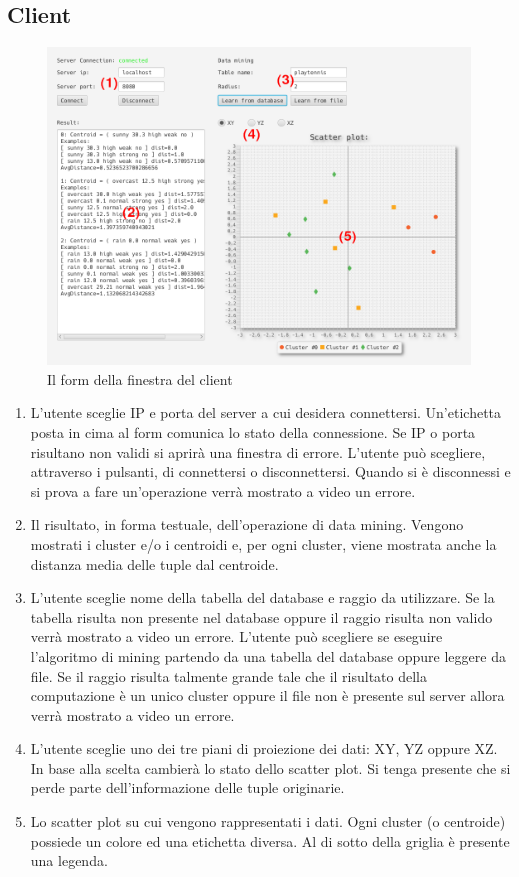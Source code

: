 \documentclass{article}
\begin{document}
	\subsection{Client}
	\begin{figure}[h]
		\includegraphics[width=\linewidth]{windowform.png}
		\caption{Il form della finestra del client}
	\end{figure}
	\begin{enumerate}
		\item L'utente sceglie IP e porta del server a cui desidera connettersi.
		Un'etichetta posta in cima al form comunica lo stato della connessione.
		Se IP o porta risultano non validi si aprirà una finestra di errore.
		L'utente può scegliere, attraverso i pulsanti, di connettersi o
		disconnettersi. Quando si è disconnessi e si prova a fare un'operazione
		verrà mostrato a video un errore.
		\item Il risultato, in forma testuale, dell'operazione di data mining.
		Vengono mostrati i cluster e/o i centroidi e, per ogni cluster, viene
		mostrata anche la distanza media delle tuple dal centroide.
		\item L'utente sceglie nome della tabella del database e raggio da
		utilizzare. Se la tabella risulta non presente nel database oppure il
		raggio risulta non valido verrà mostrato a video un errore. L'utente
		può scegliere se eseguire l'algoritmo di mining partendo da una tabella
		del database oppure leggere da file. Se il raggio risulta talmente
		grande tale che il risultato della computazione è un unico cluster
		oppure il file non è presente sul server allora verrà mostrato a
		video un errore.
		\item L'utente sceglie uno dei tre piani di proiezione dei dati:
		XY, YZ oppure XZ. In base alla scelta cambierà lo stato dello scatter
		plot. Si tenga presente che si perde parte dell'informazione delle
		tuple originarie.
		\item Lo scatter plot su cui vengono rappresentati i dati. Ogni cluster
		(o centroide) possiede un colore ed una etichetta diversa. Al di sotto
		della griglia è presente una legenda.
	\end{enumerate}
\end{document}
